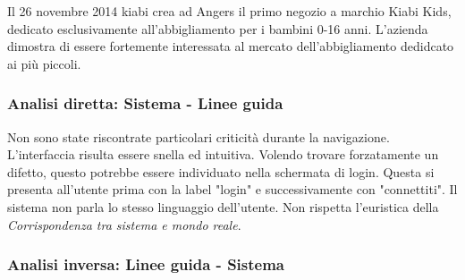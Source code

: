 \documentclass[12pt,italian,]{report}
\begin{document}
Il 26 novembre 2014 kiabi crea ad Angers il primo negozio a marchio Kiabi Kids, dedicato esclusivamente all'abbigliamento per i bambini 0-16 anni. L'azienda dimostra di essere fortemente interessata al mercato dell'abbigliamento dedidcato ai più piccoli.



\subsubsection{Analisi diretta: Sistema - Linee
guida}\label{analisi-diretta-sistema---linee-guida}


Non sono state riscontrate particolari criticità durante la navigazione. L'interfaccia risulta essere snella ed intuitiva. Volendo trovare forzatamente un difetto, questo potrebbe essere individuato nella schermata di login. Questa si presenta all'utente prima con la label "login" e successivamente con "connettiti". Il sistema non parla lo stesso linguaggio dell'utente. Non rispetta l'euristica della \emph{Corrispondenza tra sistema e mondo reale}.



\hypertarget{analisi-inversa-linee-guida---sistema}{%
\subsubsection{Analisi inversa: Linee guida -
Sistema}\label{analisi-inversa-linee-guida---sistema}}
\end{document}
